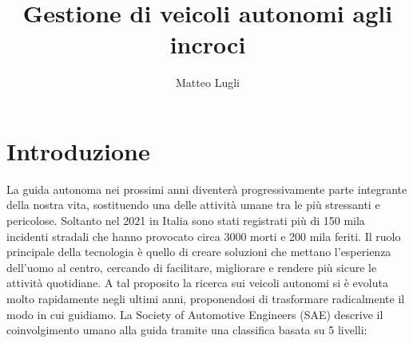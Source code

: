 \documentclass[letterpaper, 12pt]{article}
\author{Matteo Lugli}
\date{}
\title{Gestione di veicoli autonomi agli incroci}
\begin{document}
\maketitle
\tableofcontents

\newpage
\section{Introduzione}
\label{sec:orgc2d66a5}
La guida autonoma nei prossimi anni diventerà progressivamente parte
integrante della nostra vita, sostituendo una delle attività umane 
tra le più stressanti e pericolose. 
Soltanto nel 2021 in Italia sono stati registrati più di 150 mila incidenti
stradali che hanno provocato circa 3000 morti e 200 mila feriti.
Il ruolo principale della tecnologia è quello di creare soluzioni che mettano
l'esperienza dell'uomo al centro, cercando di facilitare, migliorare e rendere 
più sicure le attività quotidiane.
A tal proposito la ricerca sui veicoli autonomi si è evoluta molto rapidamente negli ultimi anni,
proponendosi di trasformare radicalmente il modo in cui guidiamo.
La Society of Automotive Engineers (SAE) descrive il coinvolgimento umano alla guida tramite
una classifica basata su 5 livelli:
\end{document}
